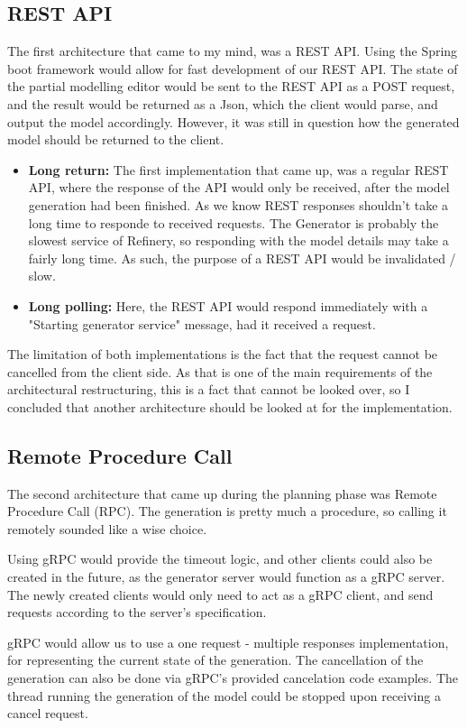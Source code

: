 \subsection{REST API}
The first architecture that came to my mind, was a REST API. Using the Spring boot framework would allow for fast development
of our REST API. The state of the partial modelling editor would be sent to the REST API as a POST request, and the result
would be returned as a Json, which the client would parse, and output the model accordingly. However, it was still in question
how the generated model should be returned to the client.
\begin{itemize}
        \item \textbf{Long return:}
		The first implementation that came up, was a regular REST API, where the response of the API would only be received, after
		the model generation had been finished. As we know REST responses shouldn't take a long time to responde to received requests.
		The Generator is probably the slowest service of Refinery, so responding with the model details may take a fairly long time.
		As such, the purpose of a REST API would be invalidated / slow.
		\item \textbf{Long polling:}
		Here, the REST API would respond immediately with a "Starting generator service" message, had it received a request.
\end{itemize}
The limitation of both implementations is the fact that the request cannot be cancelled from the client side. As that is one 
of the main requirements of the architectural restructuring, this is a fact that cannot be looked over, so I concluded that 
another architecture should be looked at for the implementation.


\subsection{Remote Procedure Call}
	The second architecture that came up during the planning phase was Remote Procedure Call (RPC). The generation is pretty much
	a procedure, so calling it remotely sounded like a wise choice. 

	Using gRPC would provide the timeout logic, and other clients
	could also be created in the future, as the generator server would function as a gRPC server. The newly created clients would only need to
	act as a gRPC client, and send requests according to the server's specification.

	gRPC would allow us to use a one request - multiple responses implementation, for representing the current state of the generation.
	The cancellation of the generation can also be done via gRPC's provided cancelation code examples. The thread running the generation of
	the model could be stopped upon receiving a cancel request.

